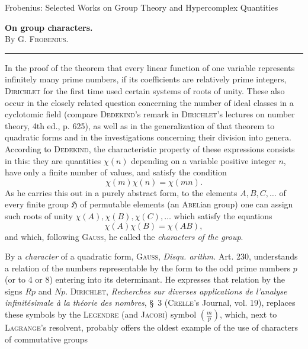 \documentclass[11pt]{article}
\newcommand{\grp}{\mathfrak{H}}
\begin{document}
\begin{center}{\huge Frobenius: Selected Works on Group Theory and Hypercomplex Quantities}\end{center}
\bigskip

\begin{center}
{\Large \textbf{On group characters.}}\\[0.8em]
{\large By G. \textsc{Frobenius}.}\\[0.6em]
\rule{6em}{0.4pt}
\end{center}

In the proof of the theorem that every linear function of one variable represents infinitely many prime numbers, if its coefficients are relatively prime integers, \textsc{Dirichlet} for the first time used certain systems of roots of unity. These also occur in the closely related question concerning the number of ideal classes in a cyclotomic field (compare \textsc{Dedekind}'s remark in \textsc{Dirichlet}'s lectures on number theory, 4th ed., p. 625), as well as in the generalization of that theorem to quadratic forms and in the investigations concerning their division into genera. According to \textsc{Dedekind}, the characteristic property of these expressions consists in this: they are quantities $\chi(n)$ depending on a variable positive integer $n$, have only a finite number of values, and satisfy the condition
\[
\chi(m)\chi(n)=\chi(mn).
\]
As he carries this out in a purely abstract form, to the elements $A,B,C,\ldots$ of every finite group $\grp$ of permutable elements (an \textsc{Abel}ian group) one can assign such roots of unity $\chi(A),\chi(B),\chi(C),\ldots$ which satisfy the equations
\[
\chi(A)\chi(B)=\chi(AB),
\]
and which, following \textsc{Gauss}, he called the \emph{characters of the group}.

By a \emph{character} of a quadratic form, \textsc{Gauss}, \emph{Disqu. arithm.} Art. 230, understands a relation of the numbers representable by the form to the odd prime numbers $p$ (or to 4 or 8) entering into its determinant. He expresses that relation by the signs $Rp$ and $Np$. \textsc{Dirichlet}, \emph{Recherches sur diverses applications de l'analyse infinitésimale à la théorie des nombres}, \S~3 (\textsc{Crelle}'s Journal, vol. 19), replaces these symbols by the \textsc{Legendre} (and \textsc{Jacobi}) symbol $\left(\frac{m}{p}\right)$, which, next to \textsc{Lagrange}'s resolvent, probably offers the oldest example of the use of characters of commutative groups
\end{document}
